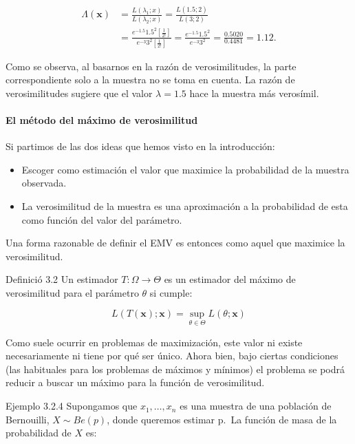 \documentclass[
]{article}
\providecommand{\tightlist}{%
  \setlength{\itemsep}{0pt}\setlength{\parskip}{0pt}}
\begin{document}
\[
\begin{aligned}
\Lambda(\mathbf{x}) & =\frac{L\left(\lambda_{1} ; x\right)}{L\left(\lambda_{2} ; x\right)}=\frac{L(1.5 ; 2)}{L(3 ; 2)} \\
& =\frac{e^{-1.5} 1.5^{2}\left[\frac{1}{2!}\right]}{e^{-3} 3^{2}\left[\frac{1}{2!}\right]}=\frac{e^{-1.5} 1.5^{2}}{e^{-3} 3^{2}}=\frac{0.5020}{0.4481}=1.12 .
\end{aligned}
\]

Como se observa, al basarnos en la razón de verosimilitudes, la parte correspondiente solo a la muestra no se toma en cuenta. La razón de verosimilitudes sugiere que el valor \(\lambda=1.5\) hace la muestra más verosímil.

\paragraph{El método del máximo de verosimilitud}\label{el-muxe9todo-del-muxe1ximo-de-verosimilitud-1}

Si partimos de las dos ideas que hemos visto en la introducción:

\begin{itemize}
\tightlist
\item
  Escoger como estimación el valor que maximice la probabilidad de la muestra observada.
\item
  La verosimilitud de la muestra es una aproximación a la probabilidad de esta como función del valor del parámetro.
\end{itemize}

Una forma razonable de definir el EMV es entonces como aquel que maximice la verosimilitud.

Definició 3.2 Un estimador \(T: \Omega \longrightarrow \Theta\) es un estimador del máximo de verosimilitud para el parámetro \(\theta\) si cumple:

\[
L(T(\mathbf{x}) ; \mathbf{x})=\sup _{\theta \in \Theta} L(\theta ; \mathbf{x})
\]

Como suele ocurrir en problemas de maximización, este valor ni existe necesariamente ni tiene por qué ser único. Ahora bien, bajo ciertas condiciones (las habituales para los problemas de máximos y mínimos) el problema se podrá reducir a buscar un máximo para la función de verosimilitud.

Ejemplo 3.2.4 Supongamos que \(x_{1}, \ldots, x_{n}\) es una muestra de una población de Bernouilli, \(X \sim B e(p)\), donde queremos estimar p.~La función de masa de la probabilidad de \(X\) es:
\end{document}
